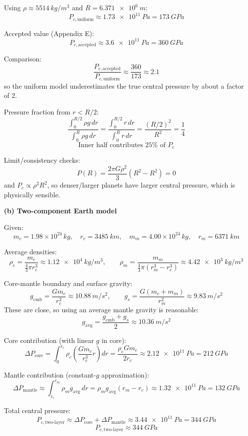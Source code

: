 \documentclass[11pt]{article}
\begin{document}
Using $\rho\approx\SI{5514}{kg/m^3}$ and $R=\SI{6.371e6}{m}$:
\[
\boxed{P_{c,\mathrm{uniform}}\approx\SI{1.73e11}{Pa}=\SI{173}{GPa}}
\]

Accepted value (Appendix E):
\[
\boxed{P_{c,\mathrm{accepted}}\approx\SI{3.6e11}{Pa}=\SI{360}{GPa}}
\]

Comparison:
\[
\frac{P_{c,\mathrm{accepted}}}{P_{c,\mathrm{uniform}}}\approx\frac{360}{173}\approx2.1
\]
so the uniform model underestimates the true central pressure by about a factor of 2.

Pressure fraction from $r<R/2$:
\[
\frac{\int_0^{R/2}\rho g\,dr}{\int_0^R\rho g\,dr}
=\frac{\int_0^{R/2}r\,dr}{\int_0^R r\,dr}
=\frac{(R/2)^2}{R^2}=\frac14
\]
\[
\boxed{\text{Inner half contributes }25\%\text{ of }P_c}
\]

Limit/consistency checks:
\[
P(R)=\frac{2\pi G\rho^2}{3}(R^2-R^2)=0
\]
and $P_c\propto \rho^2R^2$, so denser/larger planets have larger central pressure, which is physically sensible.

\vspace{\baselineskip}


\textbf{(b) Two-component Earth model}

Given:
\[
m_c=1.98\times10^{24}\,\si{kg},\quad r_c=\SI{3485}{km},\quad
m_m=4.00\times10^{24}\,\si{kg},\quad r_m=\SI{6371}{km}
\]

Average densities:
\[
\rho_c=\frac{m_c}{\frac43\pi r_c^3}\approx\SI{1.12e4}{kg/m^3},
\qquad
\rho_m=\frac{m_m}{\frac43\pi(r_m^3-r_c^3)}\approx\SI{4.42e3}{kg/m^3}
\]

Core-mantle boundary and surface gravity:
\[
g_{\mathrm{cmb}}=\frac{Gm_c}{r_c^2}\approx\SI{10.88}{m/s^2},
\qquad
g_s=\frac{G(m_c+m_m)}{r_m^2}\approx\SI{9.83}{m/s^2}
\]
These are close, so using an average mantle gravity is reasonable:
\[
g_{\mathrm{avg}}=\frac{g_{\mathrm{cmb}}+g_s}{2}\approx\SI{10.36}{m/s^2}
\]

Core contribution (with linear $g$ in core):
\[
\Delta P_{\mathrm{core}}
=\int_0^{r_c}\rho_c\left(\frac{Gm_c}{r_c^3}r\right)dr
=\frac{\rho_cGm_c}{2r_c}
\approx\SI{2.12e11}{Pa}=\SI{212}{GPa}
\]

Mantle contribution (constant-$g$ approximation):
\[
\Delta P_{\mathrm{mantle}}
\approx\int_{r_c}^{r_m}\rho_m g_{\mathrm{avg}}\,dr
=\rho_m g_{\mathrm{avg}}(r_m-r_c)
\approx\SI{1.32e11}{Pa}=\SI{132}{GPa}
\]

Total central pressure:
\[
P_{c,\mathrm{two\mbox{-}layer}}
\approx\Delta P_{\mathrm{core}}+\Delta P_{\mathrm{mantle}}
\approx\SI{3.44e11}{Pa}=\SI{344}{GPa}
\]
\[
\boxed{P_{c,\mathrm{two\mbox{-}layer}}\approx\SI{344}{GPa}}
\]
\end{document}
